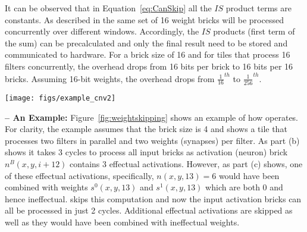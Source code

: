 It can be observed that in Equation~\ref{eq:CanSkip} all the $IS$ product terms  are constants. As described in \ZFL the same set of 16 weight bricks will be processed concurrently over different windows. Accordingly, the $IS$ products (first term of the sum) can be precalculated and only the final result need to be stored and communicated to hardware. For a brick size of 16 and for tiles that process 16 filters concurrently, the overhead drops from 16 bits per brick to 16 bits per 16 bricks. Assuming 16-bit weights, the overhead drops from $\frac{1}{16}^{th}$ to $\frac{1}{256}^{th}$.

\begin{figure*}
        \centering
        \texttt{[image: figs/example\_cnv2]}
   
\caption{\ZFLn:An example showing the skipping of weights and activations. (a) Processing bricks of 4 elements each on a tile that processes 2 filters and 4 weights per filter. (b) Execution progression in \ZFL. (c) Execution in \ZFLn.}
\label{fig:weightskipping}
\end{figure*}

\noindent\textbf{\ZFLn -- An Example:}
Figure~\ref{fig:weightskipping} 
shows an example of how \ZFLn operates. For clarity, the example assumes that the brick size is 4 and shows a tile that processes two filters in parallel and two weights (synapses) per filter. As part (b) shows it takes 3 cycles to process all input bricks as activation (neuron) brick $n^B(x,y,i+12)$ contains 3 effectual activations. However, as part (c) shows, one of these effectual activations, specifically, $n(x,y,13)=6$ would have been combined with weights $s^0(x,y,13)$ and $s^1(x,y,13)$ which are both 0 and hence ineffectual. \ZFLn skips this computation and now the input activation bricks can all be processed in just 2 cycles. Additional effectual activations are skipped as well as they would have been combined with ineffectual weights.
%
%
%
%
%
%
%
